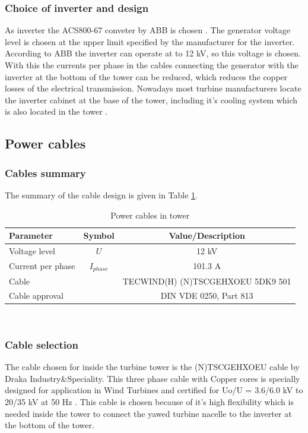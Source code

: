 \subsubsection{Choice of inverter and design}

As inverter the ACS800-67 conveter by ABB is chosen \cite{ABB}. The generator voltage level is chosen at the upper limit specified by the manufacturer for the inverter. According to ABB the inverter can operate at to 12 kV, so this voltage is chosen. With this the currents per phase in the cables connecting the generator with the inverter at the bottom of the tower can be reduced, which reduces the copper losses of the electrical transmission. Nowadays most turbine manufacturers locate the inverter cabinet at the base of the tower, including it's cooling system which is also located in the tower \cite{hau}.

\subsection{Power cables}

\subsubsection{Cables summary}
The summary of the cable design is given in Table \ref{tab:power_cables}.

\begin{table}[h]
\centering
\caption{Power cables in tower}
\label{tab:power_cables}
\begin{tabular}{ |l|c|c|} 
\hline
\textbf{Parameter} & Symbol & \textbf{Value/Description}  \\ 
\hline
Voltage level & $U$ & 12 kV\\
\hline
Current per phase & $I_{phase}$ & 101.3 A\\
\hline
Cable & & TECWIND(H) (N)TSCGEHXOEU 5DK9 501  \\
\hline
Cable approval & & DIN VDE 0250, Part 813 \\
\hline
\end{tabular} \\
\end{table}

\subsubsection{Cable selection}

The cable chosen for inside the turbine tower is the (N)TSCGEHXOEU cable by Draka Industry\&Speciality. This three phase cable with Copper cores is specially designed for application in Wind Turbines and certified for  Uo/U = 3.6/6.0 kV to 20/35 kV at 50 Hz \cite{Draka}. This cable is chosen because of it's high flexibility which is needed inside the tower to connect the yawed turbine nacelle to the inverter at the bottom of the tower.

